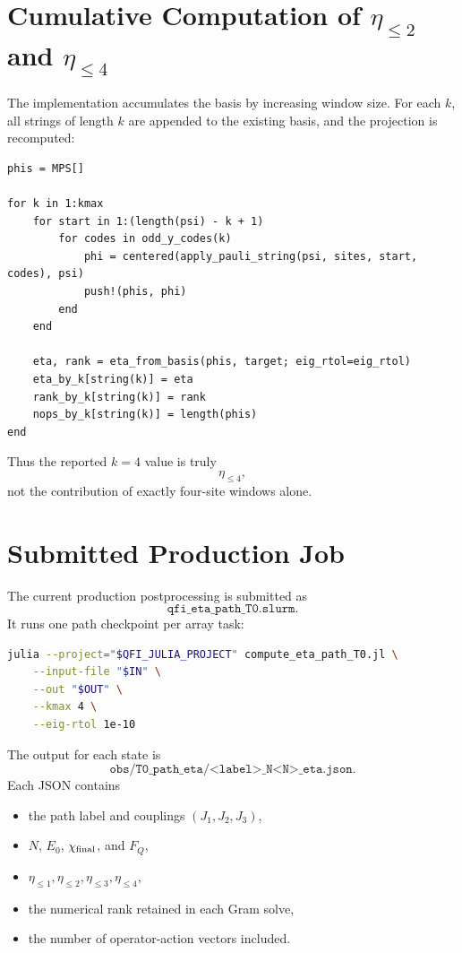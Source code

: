 \documentclass[11pt]{article}
\newcommand{\FQ}{F_Q}
\begin{document}
\section{Cumulative Computation of \texorpdfstring{$\eta_{\le2}$}{eta<=2}
and \texorpdfstring{$\eta_{\le4}$}{eta<=4}}

The implementation accumulates the basis by increasing window size.  For
each $k$, all strings of length $k$ are appended to the existing basis,
and the projection is recomputed:
\begin{lstlisting}
phis = MPS[]

for k in 1:kmax
    for start in 1:(length(psi) - k + 1)
        for codes in odd_y_codes(k)
            phi = centered(apply_pauli_string(psi, sites, start, codes), psi)
            push!(phis, phi)
        end
    end

    eta, rank = eta_from_basis(phis, target; eig_rtol=eig_rtol)
    eta_by_k[string(k)] = eta
    rank_by_k[string(k)] = rank
    nops_by_k[string(k)] = length(phis)
end
\end{lstlisting}
Thus the reported $k=4$ value is truly
\[
  \eta_{\le4},
\]
not the contribution of exactly four-site windows alone.

\section{Submitted Production Job}

The current production postprocessing is submitted as
\[
  \texttt{qfi\_eta\_path\_T0.slurm}.
\]
It runs one path checkpoint per array task:
\begin{lstlisting}[language=bash]
julia --project="$QFI_JULIA_PROJECT" compute_eta_path_T0.jl \
    --input-file "$IN" \
    --out "$OUT" \
    --kmax 4 \
    --eig-rtol 1e-10
\end{lstlisting}
The output for each state is
\[
  \texttt{obs/T0\_path\_eta/<label>\_N<N>\_eta.json}.
\]
Each JSON contains
\begin{itemize}
  \item the path label and couplings $(J_1,J_2,J_3)$,
  \item $N$, $E_0$, $\chi_{\rm final}$, and $\FQ$,
  \item $\eta_{\le1},\eta_{\le2},\eta_{\le3},\eta_{\le4}$,
  \item the numerical rank retained in each Gram solve,
  \item the number of operator-action vectors included.
\end{itemize}
\end{document}
